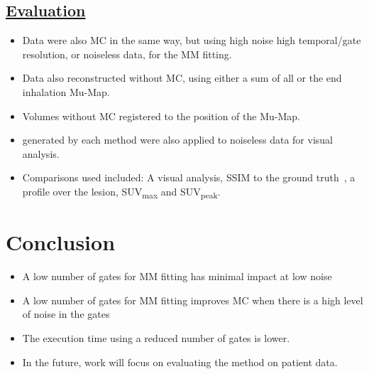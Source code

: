 \documentclass[portrait, color=UCLburgundy, margin=1cm]{uclposter}
\begin{document}
\begin{multicols}{3}
            \subsection*{\underline{\textbf{Evaluation}}}
                \begin{itemize}
                    \item Data were also \gls{MC} in the same way, but using high noise high temporal/gate resolution, or noiseless data, for the \gls{MM} fitting.
                    \item Data also reconstructed without \gls{MC}, using either a sum of all  or the end inhalation \gls{Mu-Map}.
                    \item Volumes without \gls{MC} registered to the position of the \gls{Mu-Map}.
                    \item {} generated by each method were also applied to noiseless data for visual analysis.
                    \item Comparisons used included: A visual analysis, \acrshort{SSIM} to the ground truth~\cite{Wang2009MeanMeasures}, a profile over the lesion, \gls{SUV}\textsubscript{max} and \gls{SUV}\textsubscript{peak}.
                \end{itemize}
        
        \section*{Conclusion}
            \begin{highlightbox}[UCLlightgreen]
                \begin{itemize}
                    \item A low number of gates for \gls{MM} fitting has minimal impact at low noise
                    \item A low number of gates for \gls{MM} fitting improves \gls{MC} when there is a high level of noise in the gates
                    \item The execution time using a reduced number of gates is lower.
                    \item In the future, work will focus on evaluating the method on patient data.
                \end{itemize}
            \end{highlightbox}
        
        \AtNextBibliography{\tiny}
        \printbibliography
    \end{multicols}
    
\end{document}
